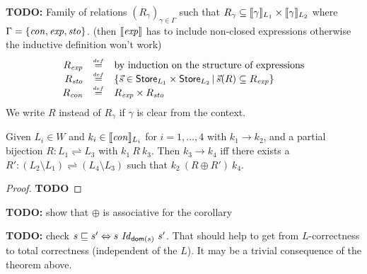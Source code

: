\documentclass[12pt,a4paper]{article}
\newcommand{\scon}{\nstyle{con}}
\newcommand{\sexp}{\nstyle{exp}}
\newcommand{\ssto}{\nstyle{sto}}
\begin{document}
{\bf TODO:} Family of relations $(R_{\gamma})_{\gamma\in\Gamma}$ such that
$R_\gamma \subseteq \llbracket\gamma\rrbracket_{L_1} \times \llbracket\gamma\rrbracket_{L_2}$
where $\Gamma=\{\scon,\sexp,\ssto\}$. (then $\semantic{\sexp}$ has to include non-closed expressions
otherwise the inductive definition won't work)
\[\begin{array}{rcl}
  R_{\sexp} &\defeqn& \text{by induction on the structure of expressions} \\
  R_{\ssto} &\defeqn& \{ \vec{s} \in \Store_{L_1} \times \Store_{L_2}\,|\,\vec{s}(R) \subseteq R_{\sexp}\} \\
  R_{\scon} &\defeqn& R_{\sexp} \times R_{\ssto}
\end{array}\]
We write $R$ instead of $R_\gamma$ if $\gamma$ is clear from the context.

\begin{theorem}
  Given $L_i\in W$ and $k_i\in\semantic{\scon}_{L_i}$ for $i=1,\ldots,4$ with $k_1 \to k_2$, and a partial
  bijection $R: L_1 \rightleftharpoons L_3$ with $k_1\ R\ k_3$.
  Then $k_3 \to k_4$ iff there exists a $R': (L_2 \setminus L_1) \rightleftharpoons (L_4\setminus L_3)$
  such that $k_2\ (R \oplus R')\ k_4$.
\end{theorem}

\begin{proof}
  {\bf TODO}
\end{proof}

{\bf TODO:} show that $\oplus$ is associative for the corollary

{\bf TODO:} check $s \sqsubseteq s' \Leftrightarrow s\ \Id_{\dom{s}}\ s'$.
That should help to get from $L$-correctness to total correctness (independent of the $L$). It may be a trivial
consequence of the theorem above.
\end{document}
